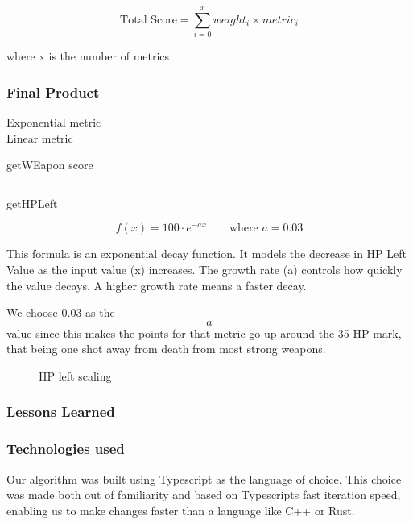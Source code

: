 \documentclass[a4paper,twoside]{bth}
\begin{document}
$$\text{Total Score} = \sum_{i=0}^{x} weight_i \times metric_i $$

where x is the number of metrics
\subsubsection{Final Product}

Exponential metric
$$

$$
Linear metric
$$

$$

getWEapon score

$$

$$

getHPLeft

$$f(x) = 100 \cdot e^{-ax}  \qquad \text{where } a = 0.03$$

This formula is an exponential decay function. It models the decrease in HP Left Value as the input value (x) increases. The growth rate (a) controls how quickly the value decays. A higher growth rate means a faster decay. 

We choose 0.03 as the $$a$$ value since this makes the points for that metric go up around the 35 HP mark, that being one shot away from death from most strong weapons.


\begin{figure}
    \centering
    \caption{HP left scaling}
    \label{fig:hp-left}
\end{figure}

\subsubsection{Lessons Learned}

\subsubsection{Technologies used}
Our algorithm was built using Typescript as the language of choice. This choice was made both out of familiarity and based on Typescripts fast iteration speed, enabling us to make changes faster than a language like C++ or Rust.
\end{document}
